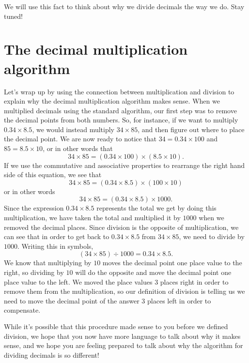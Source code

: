 \documentclass{ximera}
\begin{document}
We will use this fact to think about why we divide decimals the way we do. Stay tuned!


\section{The decimal multiplication algorithm}
Let's wrap up by using the connection between multiplication and division to explain why the decimal multiplication algorithm makes sense. When we multiplied decimals using the standard algorithm, our first step was to remove the decimal points from both numbers. So, for instance, if we want to multiply $0.34 \times 8.5$, we would instead multiply $34 \times 85$, and then figure out where to place the decimal point. We are now ready to notice that $34 = 0.34 \times 100$ and $85 = 8.5 \times 10$, or in other words that
\[
34 \times 85 = (0.34 \times 100) \times (8.5 \times 10).
\]
If we use the commutative and associative properties to rearrange the right hand side of this equation, we see that 
\[
34 \times 85 = (0.34 \times 8.5) \times (100 \times 10)
\]
or in other words
\[
34 \times 85 = (0.34 \times 8.5) \times 1000.
\]
Since the expression $0.34 \times 8.5$ represents the total we get by doing this multiplication, we have taken the total and multiplied it by $1000$ when we removed the decimal places. Since division is the opposite of multiplication, we can see that in order to get back to $0.34 \times 8.5$ from $34 \times 85$, we need to divide by $1000$. Writing this in symbols, 
\[
(34 \times 85) \div 1000 = 0.34 \times 8.5.
\]
We know that multiplying by $10$ moves the decimal point one place value to the right, so dividing by $10$ will do the opposite and move the decimal point one place value to the left. We moved the place values $3$ places right in order to remove them from the multiplication, so our definition of division is telling us we need to move the decimal point of the answer $3$ places left in order to compensate.

While it's possible that this procedure made sense to you before we defined division, we hope that you now have more language to talk about why it makes sense, and we hope you are feeling prepared to talk about why the algorithm for dividing decimals is so different!
\end{document}
